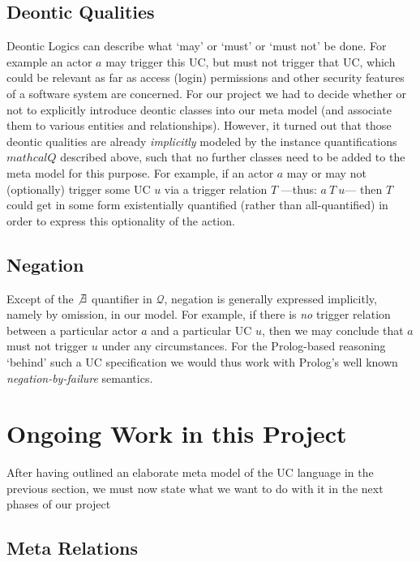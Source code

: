 \subsection{Deontic Qualities}

Deontic Logics can describe what `may' or `must' or `must not' be done. 
For example an actor $a$ may trigger this UC, but must not trigger that 
UC, which could be relevant as far as access (login) permissions and 
other security features of a software system are concerned. For our
project we had to decide whether or not to explicitly introduce deontic 
classes into our meta model (and associate them to various entities and 
relationships). However, it turned out that those deontic qualities are 
already \emph{implicitly} modeled by the instance quantifications $mathcal{Q}$
described above, such that no further classes need to be added to the meta 
model for this purpose.
For example, if an actor $a$ may or may not (optionally) trigger some UC 
$u$ via a trigger relation $T$ ---thus: $a~T~u$--- then $T$ could get in 
some form existentially quantified (rather than all-quantified) in order 
to express this optionality of the action. 

\subsection{Negation}

Except of the $\not\exists$ quantifier in $\mathcal{Q}$, negation is 
generally expressed implicitly, namely by omission, in our model. For 
example, if there is \emph{no} trigger relation between a particular 
actor $a$ and a particular UC $u$, then we may conclude that $a$ must 
not trigger $u$ under any circumstances. For the {\sc Prolog}-based
reasoning `behind' such a UC specification we would thus work with 
{\sc Prolog}'s well known \emph{negation-by-failure} semantics.

\section{Ongoing Work in this Project}

After having outlined an elaborate meta model of the UC language in 
the previous section, we must now state what we want to do with it
in the next phases of our project

\subsection{Meta Relations}

